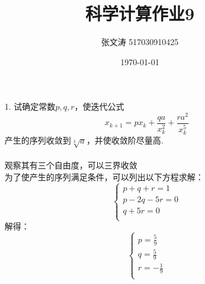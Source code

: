 \documentclass{article}
\title{科学计算作业9}
\author{张文涛 517030910425}
\date{\today}
\begin{document}
	\maketitle
	\begin{itemize}
		\item[1.]试确定常数$p,q,r$，使迭代公式
		$$x_{k+1} = px_{k} + \frac{qa}{x_k^2} +\frac{ra^2}{x^5_k}$$
		产生的序列收敛到$\sqrt[3]{a}$，并使收敛阶尽量高.\\
		\\
		观察其有三个自由度，可以三界收敛\\
		为了使产生的序列满足条件，可以列出以下方程求解：
		$$
			\left\{
			\begin{array}{lcl}
			p + q + r = 1\\
			p - 2q-5r = 0\\
			q + 5r = 0\\
			\end{array}
			\right.
		$$
		解得：
		$$
		\left\{
		\begin{array}{lcl}
		p= \frac{5}{9}\\
		q =\frac{5}{9}\\
		r = -\frac{1}{9}\\
		\end{array}
		\right.
		$$\\
		

\end{itemize}
\end{document}
